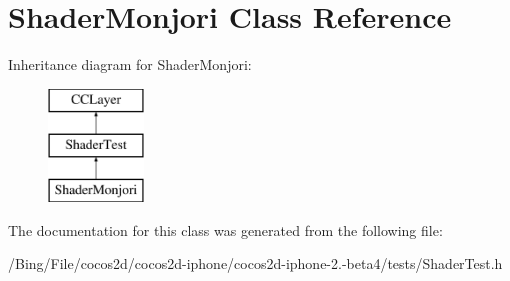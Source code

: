 \hypertarget{interface_shader_monjori}{\section{Shader\-Monjori Class Reference}
\label{interface_shader_monjori}
}
Inheritance diagram for Shader\-Monjori\-:\begin{figure}[H]
\begin{center}
\leavevmode
\includegraphics[height=3.000000cm]{interface_shader_monjori}
\end{center}
\end{figure}


The documentation for this class was generated from the following file\-:\begin{DoxyCompactItemize}
\item 
/\-Bing/\-File/cocos2d/cocos2d-\/iphone/cocos2d-\/iphone-\/2.-\/beta4/tests/Shader\-Test.\-h\end{DoxyCompactItemize}
